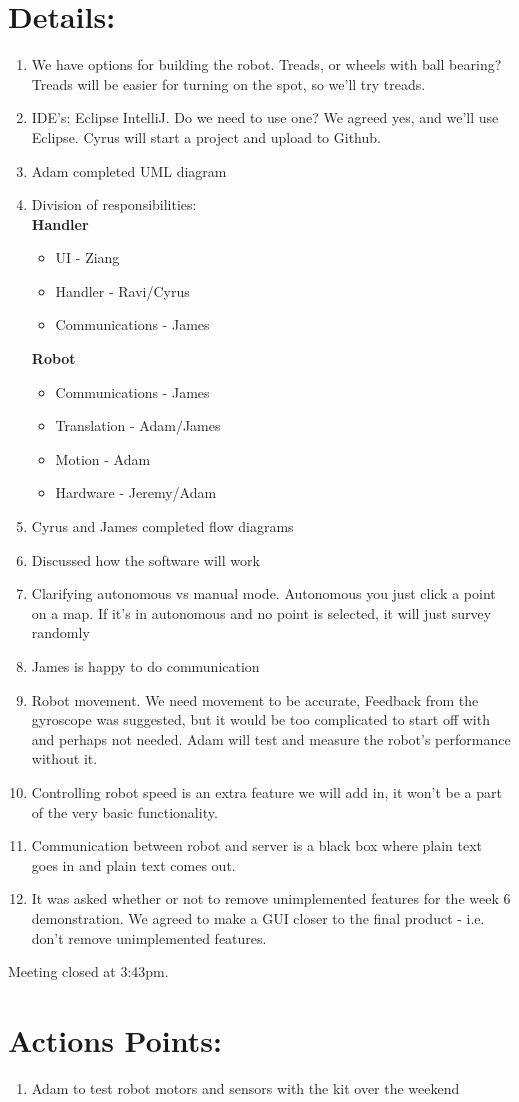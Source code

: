 \documentclass{article}
\begin{document}
\section{Details:}
\begin{enumerate}
\item We have options for building the robot. Treads, or wheels with ball bearing? Treads will be easier for turning on the spot, so we'll try treads.
\item IDE's: Eclipse IntelliJ. Do we need to use one? We agreed yes, and we'll use Eclipse. Cyrus will start a project and upload to Github.
\item Adam completed UML diagram
\item Division of responsibilities:\\
\textbf{Handler} \begin{itemize}
\item UI - Ziang
\item Handler - Ravi/Cyrus
\item Communications - James
\end{itemize}
\textbf{Robot} \begin{itemize}
\item Communications - James
\item Translation - Adam/James
\item Motion - Adam
\item Hardware - Jeremy/Adam
\end{itemize}

\item Cyrus and James completed flow diagrams
\item Discussed how the software will work
\item Clarifying autonomous vs manual mode. Autonomous you just click a point on a map. If it's in autonomous and no point is selected, it will just survey randomly
\item James is happy to do communication
\item Robot movement. We need movement to be accurate, Feedback from the gyroscope was suggested, but it would be too complicated to start off with and perhaps not needed. Adam will test and measure the robot's performance without it.
\item Controlling robot speed is an extra feature we will add in, it won't be a part of the very basic functionality.
\item Communication between robot and server is a black box where plain text goes in and plain text comes out.
\item It was asked whether or not to remove unimplemented features for the week 6 demonstration. We agreed to make a GUI closer to the final product - i.e. don't remove unimplemented features.
\end{enumerate}

Meeting closed at 3:43pm.

\section{Actions Points:}
\begin{enumerate}
\item Adam to test robot motors and sensors with the kit over the weekend
\end{enumerate}
\end{document}
